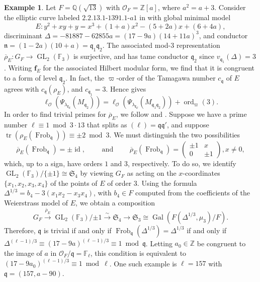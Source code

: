 \documentclass[a4paper, notitlepage, 10pt]{amsart}
\theoremstyle{plain} %
\theoremstyle{definition} %
\newtheorem{example}[theorem]{Example}
\theoremstyle{remark} %
\numberwithin{equation}{section}
\newcommand{\GL}{\operatorname{GL}} %
\newcommand{\Frob}{\operatorname{Frob}} %
\newcommand{\Gal}{\operatorname{Gal}} %
\newcommand{\id}{\operatorname{id}} %
\newcommand{\ord}{\operatorname{ord}} %
\newcommand{\tr}{\operatorname{tr}} %
\begin{document}
\begin{example}
    Let $F=\mathbb{Q}(\sqrt{13})$ with $\mathcal{O}_F=\mathbb{Z}[a]$, where $a^2=a+3$. Consider the elliptic curve labeled $2.2.13.1$-$1391.1$-$a1$ in \cite{lmfdb} with global minimal model
    $$ E: y^2+xy+y=x^3+(1+a)x^2 -(5+2a)x + (6+4a),$$
    discriminant $\Delta=-81887-62855a=(17-9a)(14+11a)^3$, and conductor $\mathfrak{n}=(1-2a)(10+a)=\mathfrak{q}_1\mathfrak{q}_2$. The associated mod-$3$ representation $\overline{\rho}_E\colon G_F\to \GL_2(\mathbb{F}_3)$ is surjective, and has tame conductor $\mathfrak{q}_2$ since $v_{\mathfrak{q}_1}(\Delta)=3$. Writing $\mathbf{f}_E$ for the associated Hilbert modular form, we find that it is congruent to a form of level $\mathfrak{q}_2$. In fact, the $\varpi$-order of the Tamagawa number $c_{\mathfrak{q}}$ of $E$ agrees with $ c_{\mathfrak{q}}(\rho_E)$, and $c_{\mathfrak{q}_1}=3$. Hence  gives
    $$ \ell_{\mathcal{O}}(\Psi_{\lambda_{\mathbf{f}_E}}(M_{\mathfrak{q}_2}))=\ell_{\mathcal{O}}(\Psi_{\lambda_{\mathbf{f}_E}}(M_{\mathfrak{q}_1\mathfrak{q}_2}))+\ord_{\varpi}(3).$$
    In order to find trivial primes for $\overline{\rho}_E$, we follow \cite{Rib90} and \cite[p.305]{Ser72}. Suppose we have a prime number $\ell\equiv 1\bmod 3\cdot 13$ that splits as $(\ell)=\mathfrak{q}\mathfrak{q}'$, and suppose  $\tr(\rho_E(\Frob_{\mathfrak{q}}))\equiv \pm 2 \bmod 3$. We must distinguish the two possibilities
    $$ \overline{\rho}_E(\Frob_{\mathfrak{q}})=\pm \id, \quad \quad \text{ and } \quad \quad \overline{\rho}_E(\Frob_{\mathfrak{q}})=\begin{pmatrix}
        \pm 1 & x \\ 0 & \pm 1
    \end{pmatrix}, x\neq 0,  $$
  which, up to a sign, have orders $1$ and $3$, respectively. To do so, we identify $\GL_2(\mathbb{F}_3)/\{\pm 1\}\cong \mathfrak{S}_4$ by viewing $G_F$ as acting on the $x$-coordinates $\{x_1,x_2,x_3,x_4\}$ of the points of $E$ of order $3$. Using the formula $\Delta^{1/3}=b_4-3(x_1x_2-x_3x_4)$, with $b_4\in F$ computed from the coefficients of the Weierstrass model of $E$, we obtain a composition 
    $$ G_F\xrightarrow{\overline{\rho}_E} \GL_2(\mathbb{F}_3)/{\pm 1} \xrightarrow{\sim} \mathfrak{S}_4 \longrightarrow \mathfrak{S}_3\cong \Gal(F(\Delta^{1/3},\mu_3)/F). $$
    Therefore, $\mathfrak{q}$ is trivial if and only if $\Frob_{\mathfrak{q}}(\Delta^{1/3})=\Delta^{1/3}$ if and only if $\Delta^{(\ell-1)/3}\equiv (17-9a) ^{(\ell-1)/3} \equiv 1 \bmod \mathfrak{q}$. Letting $a_0\in \mathbb{Z}$ be congruent to the image of $a$ in $\mathcal{O}_F/\mathfrak{q}=\mathbb{F}_{\ell}$, this condition is equivalent to $(17-9a_0) ^{(\ell-1)/3}\equiv 1 \bmod \ell$. One such example is $\ell=157$ with $\mathfrak{q}=(157,a-90)$.
\end{example}
\end{document}
